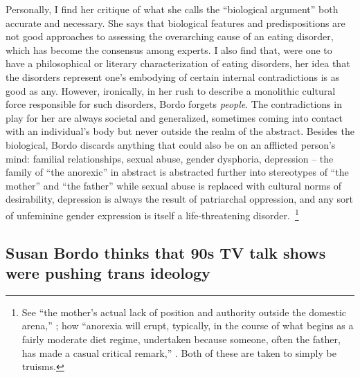 \documentclass[11pt]{article}
\begin{document}
    Personally, I find her critique of what she calls the ``biological argument'' both accurate and necessary. She says that biological features and predispositions are not good approaches to assessing the overarching cause of an eating disorder, which has become the consensus among experts. I also find that, were one to have a philosophical or literary characterization of eating disorders, her idea that the disorders represent one's embodying of certain internal contradictions is as good as any. However, ironically, in her rush to describe a monolithic cultural force responsible for such disorders, Bordo forgets \textit{people}. The contradictions in play for her are always societal and generalized, sometimes coming into contact with an individual's body but never outside the realm of the abstract. Besides the biological, Bordo discards anything that could also be on an afflicted person's mind: familial relationships, sexual abuse, gender dysphoria, depression -- the family of ``the anorexic'' in abstract is abstracted further into stereotypes of ``the mother'' and ``the father'' while sexual abuse is replaced with cultural norms of desirability, depression is always the result of patriarchal oppression, and any sort of unfeminine gender expression is itself a life-threatening disorder.~\footnote{See ``the mother's actual lack of position and authority outside the domestic arena,'' \Cite[207]{Bordo03}; how ``anorexia will erupt, typically, in the course of what begins as a fairly moderate diet regime, undertaken because someone, often the father, has made a casual critical remark,'' \Cite[178]{Bordo03}. Both of these are taken to simply be truisms.}

    \subsection*{Susan Bordo thinks that 90s TV talk shows were pushing trans ideology}
\end{document}
